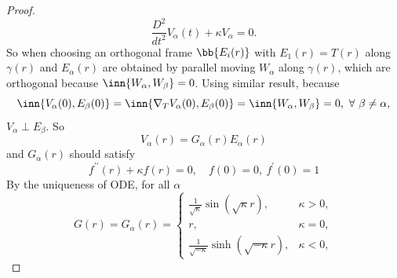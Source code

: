 \begin{proof}
\begin{equation*}
        \frac{D^2}{dt^2}V_\alpha(t) + \kappa V_\alpha = 0.
    \end{equation*}
    So when choosing an orthogonal frame $\bb{E_i(r)}$ with $E_1(r) = T(r)$ along $\gamma(r)$ and $E_\alpha(r)$ are obtained by parallel moving $W_\alpha$ along $\gamma(r)$, which are orthogonal because $\inn{W_\alpha,W_\beta} = 0$. Using similar result, because
    \begin{equation*}
        \inn{V_\alpha(0),E_\beta(0)} = \inn{\nabla_TV_\alpha(0),E_\beta(0)} = \inn{W_\alpha,W_\beta} = 0,~\forall~\beta \neq \alpha,
    \end{equation*}
    $V_\alpha \perp E_\beta$. So
    \begin{equation*}
        V_\alpha(r) = G_\alpha(r)E_\alpha(r)
    \end{equation*}
    and $G_\alpha(r)$ should satisfy
    \begin{equation*}
        f^{\prime\prime}(r) + \kappa f(r) = 0,\quad f(0) = 0,~f^\prime(0)=1
    \end{equation*}
    By the uniqueness of ODE, for all $\alpha$
    \begin{equation*}
        G(r) = G_\alpha(r) = \begin{cases}\frac{1}{\sqrt{\kappa}} \sin (\sqrt{\kappa} r), & \kappa>0, \\ r, & \kappa=0, \\ \frac{1}{\sqrt{-\kappa}} \sinh (\sqrt{-\kappa} r), & \kappa<0,\end{cases}
    \end{equation*}


\end{proof}
